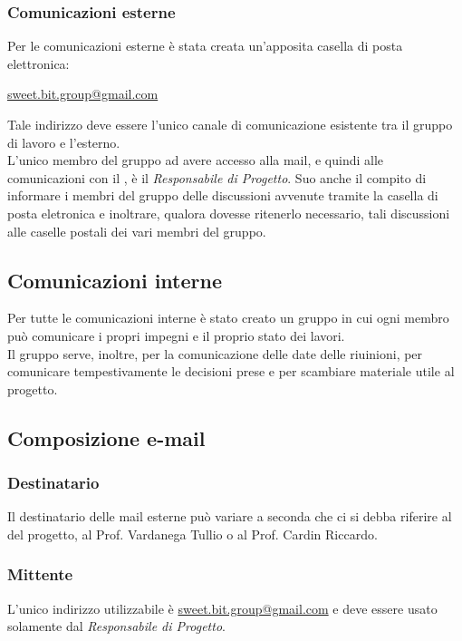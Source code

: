       \subsubsection{Comunicazioni esterne}
        Per le comunicazioni esterne è stata creata un'apposita casella di posta elettronica:\\
          \begin{center}
            \href{mailto:sweet.bit.group@gmail.com}{sweet.bit.group@gmail.com}
          \end{center}
        Tale indirizzo deve essere l’unico canale di comunicazione esistente tra il gruppo di lavoro e l’esterno.\\
        L'unico membro del gruppo ad avere accesso alla mail, e quindi alle comunicazioni con il , è il \emph{Responsabile di Progetto}.
        Suo anche il compito di informare i membri del gruppo delle discussioni avvenute tramite la casella di posta eletronica e inoltrare, qualora dovesse ritenerlo necessario,
        tali discussioni alle caselle postali dei vari membri del gruppo.
      \subsection{Comunicazioni interne}
        Per tutte le comunicazioni interne è stato creato un gruppo \textbf{} in cui ogni membro può comunicare i propri impegni e il proprio stato dei lavori.\\
        Il gruppo serve, inoltre, per la comunicazione delle date delle riuinioni, per comunicare tempestivamente le decisioni prese e per scambiare materiale utile al progetto.
      \subsection{Composizione e-mail}
        \subsubsection{Destinatario}
          Il destinatario delle mail esterne può variare a seconda che ci si debba riferire al  del progetto, al Prof. Vardanega Tullio o al Prof. Cardin Riccardo.
        \subsubsection{Mittente}
          L’unico indirizzo utilizzabile è \href{mailto:sweet.bit.group@gmail.com}{sweet.bit.group@gmail.com} e deve essere usato solamente dal \emph{Responsabile di Progetto}.
